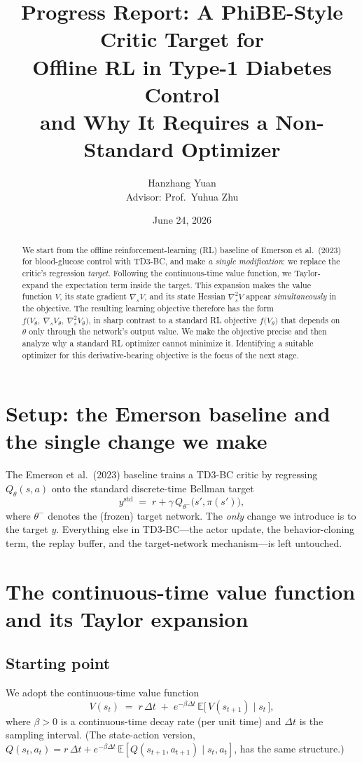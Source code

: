 \documentclass[11pt]{article}
\title{\textbf{Progress Report: A PhiBE-Style Critic Target for\\
Offline RL in Type-1 Diabetes Control\\[4pt]
\large and Why It Requires a Non-Standard Optimizer}}
\author{Hanzhang Yuan \\ \small Advisor: Prof.\ Yuhua Zhu}
\date{June 24, 2026}
\newcommand{\E}{\mathbb{E}}
\newcommand{\grads}{\nabla_s}
\newcommand{\hess}{\nabla_s^2}
\begin{document}
\maketitle

\begin{abstract}
We start from the offline reinforcement-learning (RL) baseline of
Emerson et al.\ (2023) for blood-glucose control with TD3-BC, and make
\emph{a single modification}: we replace the critic's regression
\emph{target}. Following the continuous-time value function, we Taylor-expand
the expectation term inside the target. This expansion makes the value
function $V$, its state gradient $\grads V$, and its state Hessian $\hess V$
appear \emph{simultaneously} in the objective. The resulting learning
objective therefore has the form $f\big(V_\theta,\ \grads V_\theta,\
\hess V_\theta\big)$, in sharp contrast to a standard RL objective
$f\big(V_\theta\big)$ that depends on $\theta$ only through the network's
output value. We make the objective precise and then analyze why a standard
RL optimizer cannot minimize it. Identifying a suitable optimizer for this
derivative-bearing objective is the focus of the next stage.
\end{abstract}

\section{Setup: the Emerson baseline and the single change we make}

The Emerson et al.\ (2023) baseline trains a TD3-BC critic by regressing
$Q_\theta(s,a)$ onto the standard discrete-time Bellman target
\begin{equation}
\label{eq:std-target}
y^{\mathrm{std}} \;=\; r + \gamma\, Q_{\theta^-}\!\big(s', \pi(s')\big),
\end{equation}
where $\theta^-$ denotes the (frozen) target network. The \emph{only}
change we introduce is to the target $y$. Everything else in TD3-BC---the
actor update, the behavior-cloning term, the replay buffer, and the
target-network mechanism---is left untouched.

\section{The continuous-time value function and its Taylor expansion}

\subsection{Starting point}
We adopt the continuous-time value function
\begin{equation}
\label{eq:ct-value}
V(s_t) \;=\; r\,\Delta t \;+\; e^{-\beta \Delta t}\,
\E\big[\,V(s_{t+1}) \mid s_t\,\big],
\end{equation}
where $\beta>0$ is a continuous-time decay rate (per unit time) and
$\Delta t$ is the sampling interval. (The state-action version,
$Q(s_t,a_t) = r\,\Delta t + e^{-\beta\Delta t}\,\E[Q(s_{t+1},a_{t+1})\mid
s_t,a_t]$, has the same structure.)
\end{document}
